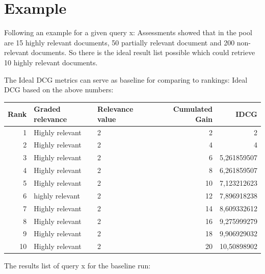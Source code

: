 \documentclass[a4paper,11pt]{article}
\begin{document}
\newpage

\appendix
\section{Example}

Following an example for a given query x:
Assessments showed that in the pool are 15 highly relevant documents, 50 partially relevant document and 200 non-relevant documents. So there is the ideal result list possible which could retrieve 10 highly relevant documents.

The Ideal DCG metrics can serve as baseline for comparing to rankings:
Ideal DCG based on the above numbers:
\newline

\begin{tabular}{|r|p{1.8cm}|p{1.8cm}|r|r|}
\hline
\textbf{Rank} & \textbf{Graded relevance} & \textbf{Relevance value} & \textbf{Cumulated Gain} & \textbf{IDCG} \\ \hline
1 & Highly relevant & 2 & 2 & 2 \\ \hline
2 & Highly relevant & 2 & 4 & 4 \\ \hline
3 & Highly relevant & 2 & 6 & 5,261859507 \\ \hline
4 & Highly relevant & 2 & 8 & 6,261859507 \\ \hline
5 & Highly relevant & 2 & 10 & 7,123212623 \\ \hline
6 & highly relevant & 2 & 12 & 7,896918238 \\ \hline
7 & Highly relevant & 2 & 14 & 8,609332612 \\ \hline
8 & Highly relevant & 2 & 16 & 9,275999279 \\ \hline
9 & Highly relevant & 2 & 18 & 9,906929032 \\ \hline
10 & Highly relevant & 2 & 20 & 10,50898902 \\ \hline
\end{tabular}
\newline

The results list of query x for the baseline run:
\newline
\end{document}
